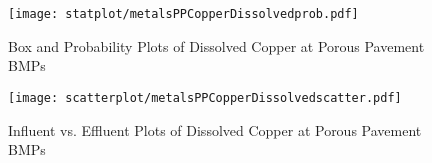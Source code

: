         \begin{figure}[hb]   %
            \centering
            \texttt{[image: statplot/metalsPPCopperDissolvedprob.pdf]}
            \caption{Box and Probability Plots of Dissolved Copper at Porous Pavement BMPs}
        \end{figure}         %
        
        
        \begin{figure}[hb]   %
            \centering
            \texttt{[image: scatterplot/metalsPPCopperDissolvedscatter.pdf]}
            \caption{Influent vs. Effluent Plots of Dissolved Copper at Porous Pavement BMPs}
        \end{figure}         %
        \clearpage
        